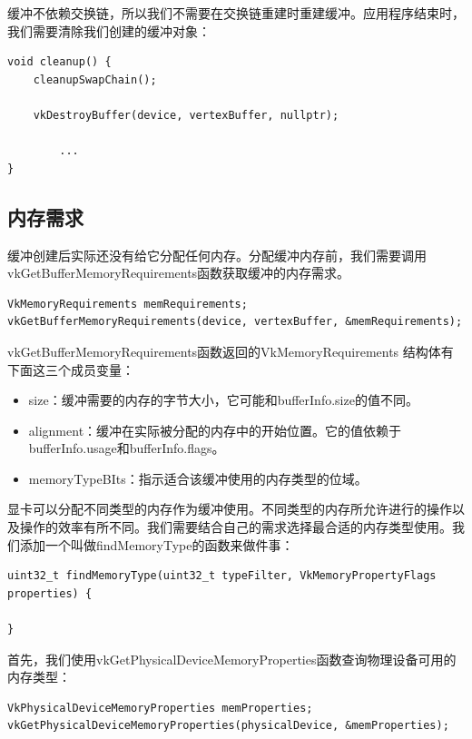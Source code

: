 \documentclass{ctexart}
\begin{document}
缓冲不依赖交换链，所以我们不需要在交换链重建时重建缓冲。应用程序结束时，我们需要清除我们创建的缓冲对象：

\begin{lstlisting}[language={[ANSI]C}]
void cleanup() {
	cleanupSwapChain();

	vkDestroyBuffer(device, vertexBuffer, nullptr);

		...
}
\end{lstlisting}

\subsection{内存需求}

缓冲创建后实际还没有给它分配任何内存。分配缓冲内存前，我们需要调用vkGetBufferMemoryRequirements函数获取缓冲的内存需求。

\begin{lstlisting}[language={[ANSI]C}]
VkMemoryRequirements memRequirements;
vkGetBufferMemoryRequirements(device, vertexBuffer, &memRequirements);
\end{lstlisting}

vkGetBufferMemoryRequirements函数返回的VkMemoryRequirements 结构体有下面这三个成员变量：

\begin{itemize}
	\item size：缓冲需要的内存的字节大小，它可能和bufferInfo.size的值不同。
	\item alignment：缓冲在实际被分配的内存中的开始位置。它的值依赖于bufferInfo.usage和bufferInfo.flags。
	\item memoryTypeBIts：指示适合该缓冲使用的内存类型的位域。
\end{itemize}

显卡可以分配不同类型的内存作为缓冲使用。不同类型的内存所允许进行的操作以及操作的效率有所不同。我们需要结合自己的需求选择最合适的内存类型使用。我们添加一个叫做findMemoryType的函数来做件事：

\begin{lstlisting}[language={[ANSI]C}]
uint32_t findMemoryType(uint32_t typeFilter, VkMemoryPropertyFlags properties) {

}
\end{lstlisting}

首先，我们使用vkGetPhysicalDeviceMemoryProperties函数查询物理设备可用的内存类型：

\begin{lstlisting}[language={[ANSI]C}]
VkPhysicalDeviceMemoryProperties memProperties;
vkGetPhysicalDeviceMemoryProperties(physicalDevice, &memProperties);
\end{lstlisting}
\end{document}
